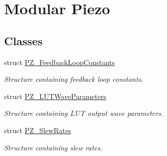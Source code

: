 \hypertarget{group___modular_piezo}{}\section{Modular Piezo}
\label{group___modular_piezo}
\subsection*{Classes}
\begin{DoxyCompactItemize}
\item 
struct \hyperlink{struct_p_z___feedback_loop_constants}{P\+Z\+\_\+\+Feedback\+Loop\+Constants}
\begin{DoxyCompactList}\small\item\em Structure containing feedback loop constants. \end{DoxyCompactList}\item 
struct \hyperlink{struct_p_z___l_u_t_wave_parameters}{P\+Z\+\_\+\+L\+U\+T\+Wave\+Parameters}
\begin{DoxyCompactList}\small\item\em Structure containing L\+UT output wave parameters. \end{DoxyCompactList}\item 
struct \hyperlink{struct_p_z___slew_rates}{P\+Z\+\_\+\+Slew\+Rates}
\begin{DoxyCompactList}\small\item\em Structure containing slew rates. \end{DoxyCompactList}\end{DoxyCompactItemize}
